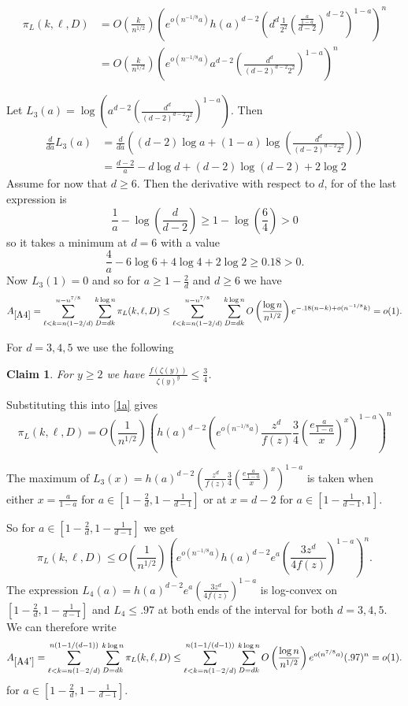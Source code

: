 \documentclass[11pt]{article}
\def\z{\zeta}
\def\p{\pi}
\newtheorem{claim}[theorem]{Claim}
\newcommand{\brac}[1]{\left(#1\right)}
\newcommand{\bfrac}[2]{\brac{\frac{#1}{#2}}}
\newcommand{\beq}[1]{\begin{equation}\label{#1}}
\newcommand{\eeq}{\end{equation}}
\begin{document}
\begin{align}
\p_L(k,\ell,D)&=O\bfrac{k}{n^{1/2}}\brac{e^{o(n^{-1/8}a)}h(a)^{d-2} \brac{d^d\frac{1}{2^2}\bfrac{\frac{a}{1-a}}{d-2}^{d-2}}^{1-a}}^n\nonumber\\
&=O\bfrac{k}{n^{1/2}}\brac{e^{o(n^{-1/8}a)}a^{d-2}\bfrac{d^d}{(d-2)^{d-2}2^2}^{1-a}}^n\label{2a}
\end{align}

Let $L_3(a)=\log\brac{a^{d-2}\bfrac{d^d}{(d-2)^{d-2}2^2}^{1-a}}$. Then
\begin{align*}
\frac{d}{d a} L_3(a) &= \frac{d}{da}\brac{(d-2)\log a + (1-a)\log\bfrac{d^d}{(d-2)^{d-2}2^2}}\\
&=\frac{d-2}{a} -d\log d + (d-2)\log(d-2)+2\log2
\end{align*}
Assume for now that $d\geq 6$.
Then the derivative with respect to $d$, for of the last expression is
$$
\frac{1}{a}-\log\bfrac{d}{d-2} \ge 1-\log\bfrac{6}{4}>0
$$
so it takes a minimum at $d=6$ with a value
$$
\frac{4}{a}-6\log 6 +4\log 4+ 2\log 2 \ge 0.18>0.
$$
Now $L_3(1)=0$ and so for $a\geq 1-\frac{2}{d}$ and $d\ge 6$ we have
\beq{A4}
A_{\ref{A4}}=\sum_{\ell<k=n(1-2/d)}^{n-n^{7/8}}\sum_{D=dk}^{k\log n}\p_L(k,\ell,D)
\leq \sum_{\ell<k=n(1-2/d)}^{n-n^{7/8}}\sum_{D=dk}^{k\log n}
O\bfrac{\log n}{n^{1/2}}e^{-.18(n-k)+o(n^{-1/8}k)}=o(1).
\eeq

For $d=3,4,5$ we use the following
\begin{claim}\label{claim:fz}
For $y\ge 2$ we have $\frac{f(\z(y))}{\z(y)^y} \le \frac{3}{4}$.
\end{claim}

Substituting this into \eqref{1a} gives
\beq{2b}
\p_L(k,\ell,D)=O\bfrac{1}{n^{1/2}}\brac{h(a)^{d-2}
\brac{e^{o(n^{-1/8}a)}\frac{z^d}{f(z)}\frac{3}{4}\bfrac{e\frac{a}{1-a}}{x}^x}^{1-a}}^n
\eeq

The maximum of $L_3(x)=h(a)^{d-2}\brac{\frac{z^d}{f(z)}\frac{3}{4}\bfrac{e\frac{a}{1-a}}{x}^x}^{1-a}$ 
is taken when either $x = \frac{a}{1-a}$ for $a \in [1-\frac{2}{d},1-\frac{1}{d-1}]$ or at $x=d-2$ 
for $a\in[1-\frac{1}{d-1},1]$.

So for $a\in[1-\frac{2}{d},1-\frac{1}{d-1}]$ we get
$$
\p_L(k,\ell,D)\leq O\bfrac{1}{n^{1/2}}\brac{e^{o(n^{-1/8}a)}h(a)^{d-2}e^a\bfrac{3z^d}{4f(z)}^{1-a}}^n.
$$
The expression $L_4(a)=h(a)^{d-2}e^a\bfrac{3z^d}{4f(z)}^{1-a}$ is log-convex on $[1-\frac{2}{d},1-\frac{1}{d-1}]$ 
and $L_4\leq .97$ at both ends of the interval for both $d=3,4,5$.
We can therefore write
\beq{A4'}
A_{\ref{A4'}}=\sum_{\ell<k=n(1-2/d)}^{n(1-1/(d-1))}\sum_{D=dk}^{k\log n}\p_L(k,\ell,D)
\leq \sum_{\ell<k=n(1-2/d)}^{n(1-1/(d-1))}\sum_{D=dk}^{k\log n}
O\bfrac{\log n}{n^{1/2}}e^{o(n^{7/8}a)}(.97)^n=o(1).
\eeq
for $a\in [1-\frac{2}{d},1-\frac{1}{d-1}]$.
\end{document}
